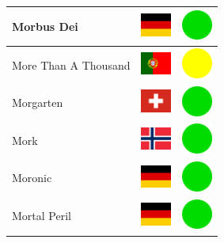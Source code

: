\documentclass[12pt, a4paper, twoside]{report}
\begin{document}
\begin{center}
\begin{longtable}{|p{5cm}|p{2cm}|p{2cm}|}
 Morbus Dei                                                 & \includegraphics[width=1cm]{../img/flags/de} &   \includegraphics[width=1cm]{../likes/y} \\ \hline
 More Than A Thousand                                       & \includegraphics[width=1cm]{../img/flags/pt} &   \includegraphics[width=1cm]{../likes/m} \\ \hline
 Morgarten                                                  & \includegraphics[width=1cm]{../img/flags/ch} &   \includegraphics[width=1cm]{../likes/y} \\ \hline
 Mork                                                       & \includegraphics[width=1cm]{../img/flags/no} &   \includegraphics[width=1cm]{../likes/y} \\ \hline
 Moronic                                                    & \includegraphics[width=1cm]{../img/flags/de} &   \includegraphics[width=1cm]{../likes/y} \\ \hline
 Mortal Peril                                               & \includegraphics[width=1cm]{../img/flags/de} &   \includegraphics[width=1cm]{../likes/y} \\ \hline

\end{longtable}
\end{center}
\end{document}
